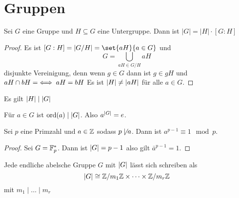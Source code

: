 \section{Gruppen}
\begin{Satz}[Gruppenordnung]
    Sei \(G\) eine Gruppe und \(H\subseteq G\) eine Untergruppe. Dann ist \(|G|=|H|\cdot [G:H]\)
\end{Satz}
\begin{proof}
    Es ist \([G:H]=\abs{G/H}=\set{aH}{a\in G}\) und \[G=\bigcup_{aH\in G/H}aH\] disjunkte Vereinigung, denn wenn \(g\in G\) dann ist \(g\in gH\) und \(aH\cap bH=\empty \iff aH=bH\) Es ist \(\lvert H\rvert\not=\lvert aH\rvert\) für alle \(a\in G\).
\end{proof}
\begin{Kor}\label{Kor:Lagrange}
    Es gilt \(\lvert H\rvert\mid\lvert G\rvert\)
\end{Kor}
\begin{Kor}\label{Kor:Lagrange2}
Für \(a\in G\) ist \(\operatorname{ord}(a)\mid \lvert G\rvert\). Also \(a^{\lvert G\rvert}=e\).
\end{Kor}
\begin{Kor}\label{Kleiner Satz von Fermat}
    Sei \(p\) eine Primzahl und \(a\in\mathbb{Z}\) sodass \(p\not\mid a\). Dann ist \(a^{p-1}\equiv 1\mod p\).
\end{Kor}
\begin{proof}
    Sei \(G=\mathbb{F}_p^*\). Dann ist \(\lvert G\rvert=p-1\) also gilt \(\bar a^{p-1}=1\).
\end{proof}
\begin{Satz} \label{Satz:StuktEndlAb}
Jede endliche abelsche Gruppe \(G\) mit \(\lvert G\rvert\) lässt sich schreiben als 
\[\lvert G\rvert\cong \mathbb{Z}/m_1\mathbb{Z}\times\dots\times\mathbb{Z}/m_r\mathbb{Z}\] mit \(m_1\mid\dots\mid m_r\)
\end{Satz}
